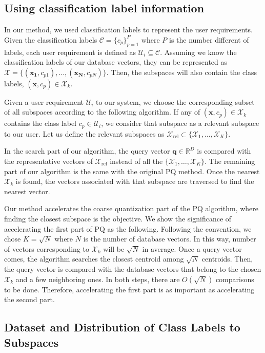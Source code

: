 \subsection{Using classification label information}

In our method, we used classification labels to represent the user requirements. 
Given the classification labels $\mathcal{C} = \{c_p\}_{p=1}^P$ where $P$ is the number different of labels, each user requirement is defined as $\mathcal{U}_i \subseteq \mathcal{C}$. 
Assuming we know the classification labels of our database vectors, they can be represented as $\mathcal{X} = \{(\bm{x_1}, c_{p1}), \dots, (\bm{x_N}, c_{pN})\}$.
Then, the subspaces will also contain the class labels, $(\bm{x}, c_p) \in \mathcal{X}_k$.

Given a user requirement $\mathcal{U}_i$ to our system, we choose the corresponding subset of all subspaces according to the following algorithm.
If any of $(\bm{x}, c_p) \in \mathcal{X}_k$ contains the class label $c_p \in \mathcal{U}_i$, we consider that subspace as a relevant subspace to our user.
Let us define the relevant subspaces as $\mathcal{X}_\mathrm{rel} \subset \{\mathcal{X}_1,\dots,\mathcal{X}_K\}$.

In the search part of our algorithm, the query vector $\bm{q} \in \mathbb{R}^D$ is compared with the representative vectors of $\mathcal{X}_\mathrm{rel}$ instead of all the $\{\mathcal{X}_1,\dots,\mathcal{X}_K\}$. 
The remaining part of our algorithm is the same with the original PQ method.
Once the nearest $\mathcal{X}_k$ is found, the vectors associated with that subspace are traversed to find the nearest vector.

Our method accelerates the coarse quantization part of the PQ algorithm, where finding the closest subspace is the objective. 
We show the significance of accelerating the first part of PQ as the following.
Following the convention, we chose $K=\sqrt{N}$ where $N$ is the number of database vectors. 
In this way, number of vectors corresponding to $\mathcal{X}_k$ will be $\sqrt{N}$ in average. 
Once a query vector comes, the algorithm searches the closest centroid among $\sqrt{N}$ centroids. 
Then, the query vector is compared with the database vectors that belong to the chosen $\mathcal{X}_k$ and a few neighboring ones. 
In both steps, there are $O(\sqrt{N})$ comparisons to be done. 
Therefore, accelerating the first part is as important as accelerating the second part.

\subsection{Dataset and Distribution of Class Labels to Subspaces}
\label{retrievallabelinfo}

